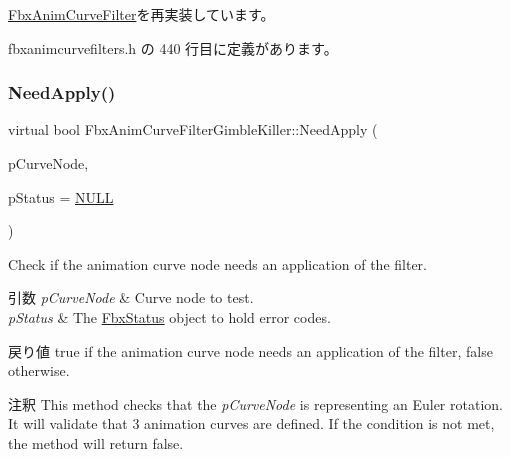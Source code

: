 \hyperlink{class_fbx_anim_curve_filter_a09438dd8d0e9bcb934e6a4b6fc51bcd7}{Fbx\+Anim\+Curve\+Filter}を再実装しています。



 fbxanimcurvefilters.\+h の 440 行目に定義があります。

\mbox{\label{class_fbx_anim_curve_filter_gimble_killer_a72a761452f1a110353be0b6cae920e24}} 
\subsubsection{\texorpdfstring{Need\+Apply()}{NeedApply()}\hspace{0.1cm}{\footnotesize\ttfamily [3/5]}}
{\footnotesize\ttfamily virtual bool Fbx\+Anim\+Curve\+Filter\+Gimble\+Killer\+::\+Need\+Apply (\begin{DoxyParamCaption}\item[{\hyperlink{class_fbx_anim_curve_node}{Fbx\+Anim\+Curve\+Node} \&}]{p\+Curve\+Node,  }\item[{\hyperlink{class_fbx_status}{Fbx\+Status} $\ast$}]{p\+Status = {\ttfamily \hyperlink{fbxarch_8h_a070d2ce7b6bb7e5c05602aa8c308d0c4}{N\+U\+LL}} }\end{DoxyParamCaption})\hspace{0.3cm}{\ttfamily [virtual]}}

Check if the animation curve node needs an application of the filter. 
\begin{DoxyParams}{引数}
{\em p\+Curve\+Node} & Curve node to test. \\
\hline
{\em p\+Status} & The \hyperlink{class_fbx_status}{Fbx\+Status} object to hold error codes. \\
\hline
\end{DoxyParams}
\begin{DoxyReturn}{戻り値}
{\ttfamily true} if the animation curve node needs an application of the filter, {\ttfamily false} otherwise. 
\end{DoxyReturn}
\begin{DoxyRemark}{注釈}
This method checks that the {\itshape p\+Curve\+Node} is representing an Euler rotation. It will validate that 3 animation curves are defined. If the condition is not met, the method will return {\ttfamily false}. 
\end{DoxyRemark}


